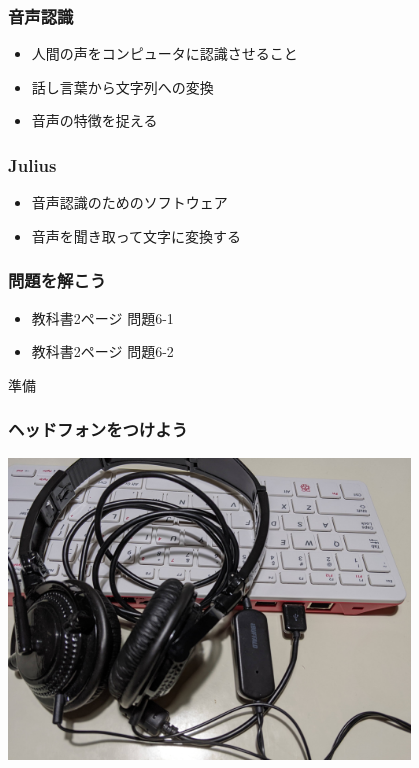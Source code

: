 \documentclass[14pt]{beamer}
\begin{document}
\begin{frame}
  \frametitle{音声認識}
  \begin{itemize}
    \item 人間の声をコンピュータに認識させること
    \item 話し言葉から文字列への変換
    \item 音声の特徴を捉える
  \end{itemize}
\end{frame}

\begin{frame}
  \frametitle{Julius}
  \begin{itemize}
    \item 音声認識のためのソフトウェア
    \item 音声を聞き取って文字に変換する
  \end{itemize}
  \centering
  
\end{frame}

\begin{frame}
  \frametitle{問題を解こう}
  \begin{itemize}
    \item 教科書2ページ 問題6-1
    \item 教科書2ページ 問題6-2
  \end{itemize}
\end{frame}

\begin{frame}
  \centering
  準備
\end{frame}

\begin{frame}
  \frametitle{ヘッドフォンをつけよう}
  \centering
  \includegraphics[width=0.8\textwidth]{how_to_connect_headset.jpg}
\end{frame}
\end{document}
